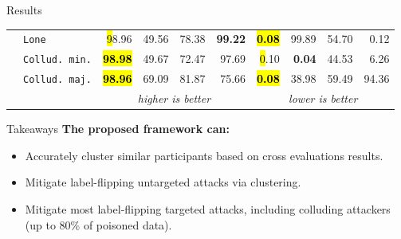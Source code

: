\begin{frame}{Results}
\begin{table}
\begin{tabularx}{.8\textwidth}{lX|rrrr|rrrr}
      & \texttt{Lone}          & \hl 98.96 & 49.56 & 78.38 & \textbf{99.22} &\hl \textbf{0.08} & 99.89 & 54.70 & 0.12 \\
      & \texttt{Collud. min.}  & \hl \textbf{98.98} & 49.67 & 72.47 & 97.69 & \hl 0.10 & \textbf{0.04} & 44.53 & 6.26 \\
      & \texttt{Collud. maj.}  & \hl \textbf{98.96} & 69.09 & 81.87 & 75.66 & \hl \textbf{0.08} & 38.98 & 59.49 & 94.36 \\          
      \bottomrule %
      \small & \multicolumn{1}{c}{} & \multicolumn{4}{c}{\emph{higher is better}} & \multicolumn{4}{c}{\emph{lower is better}}
    \end{tabularx}
  \end{table}
  
\end{frame}


\begin{frame}{Takeaways}
  \textbf{The proposed framework can:}
  \begin{itemize}
    \item Accurately cluster similar participants based on cross evaluations results.
    \item Mitigate label-flipping untargeted attacks via clustering.
    \item Mitigate most label-flipping targeted attacks, including colluding attackers (up to 80\% of poisoned data).
  \end{itemize}

\end{frame}